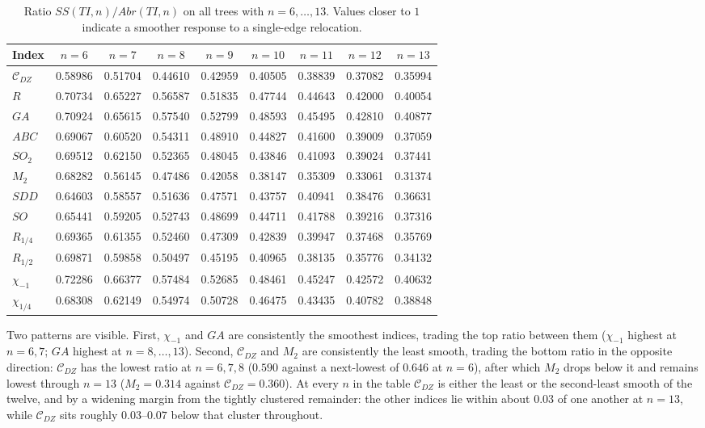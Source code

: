 \documentclass[11pt,a4paper]{article}
\theoremstyle{plain}
\theoremstyle{definition}
\theoremstyle{remark}
\newcommand{\CDZ}{\mathcal{C}_{DZ}}
\begin{document}
\begin{table}[htbp]
\centering
\small
\setlength{\tabcolsep}{4pt}
\caption{Ratio $SS(TI,n)/Abr(TI,n)$ on all trees with $n=6,\dots,13$. Values
closer to $1$ indicate a smoother response to a single-edge relocation.}
\label{tab:ssabr}
\begin{tabular}{lcccccccc}
\toprule
Index & $n{=}6$ & $n{=}7$ & $n{=}8$ & $n{=}9$ & $n{=}10$ & $n{=}11$ & $n{=}12$ & $n{=}13$ \\
\midrule
$\CDZ$       & 0.58986 & 0.51704 & 0.44610 & 0.42959 & 0.40505 & 0.38839 & 0.37082 & 0.35994 \\
$R$          & 0.70734 & 0.65227 & 0.56587 & 0.51835 & 0.47744 & 0.44643 & 0.42000 & 0.40054 \\
$GA$         & 0.70924 & 0.65615 & 0.57540 & 0.52799 & 0.48593 & 0.45495 & 0.42810 & 0.40877 \\
$ABC$        & 0.69067 & 0.60520 & 0.54311 & 0.48910 & 0.44827 & 0.41600 & 0.39009 & 0.37059 \\
$SO_2$       & 0.69512 & 0.62150 & 0.52365 & 0.48045 & 0.43846 & 0.41093 & 0.39024 & 0.37441 \\
$M_2$        & 0.68282 & 0.56145 & 0.47486 & 0.42058 & 0.38147 & 0.35309 & 0.33061 & 0.31374 \\
$SDD$        & 0.64603 & 0.58557 & 0.51636 & 0.47571 & 0.43757 & 0.40941 & 0.38476 & 0.36631 \\
$SO$         & 0.65441 & 0.59205 & 0.52743 & 0.48699 & 0.44711 & 0.41788 & 0.39216 & 0.37316 \\
$R_{1/4}$    & 0.69365 & 0.61355 & 0.52460 & 0.47309 & 0.42839 & 0.39947 & 0.37468 & 0.35769 \\
$R_{1/2}$    & 0.69871 & 0.59858 & 0.50497 & 0.45195 & 0.40965 & 0.38135 & 0.35776 & 0.34132 \\
$\chi_{-1}$  & 0.72286 & 0.66377 & 0.57484 & 0.52685 & 0.48461 & 0.45247 & 0.42572 & 0.40632 \\
$\chi_{1/4}$ & 0.68308 & 0.62149 & 0.54974 & 0.50728 & 0.46475 & 0.43435 & 0.40782 & 0.38848 \\
\bottomrule
\end{tabular}
\end{table}

Two patterns are visible. First, $\chi_{-1}$ and $GA$ are consistently the
smoothest indices, trading the top ratio between them ($\chi_{-1}$ highest at
$n=6,7$; $GA$ highest at $n=8,\dots,13$). Second, $\CDZ$ and $M_2$ are
consistently the least smooth, trading the bottom ratio in the opposite
direction: $\CDZ$ has the lowest ratio at $n=6,7,8$ ($0.590$ against a
next-lowest of $0.646$ at $n=6$), after which $M_2$ drops below it and remains
lowest through $n=13$ ($M_2=0.314$ against $\CDZ=0.360$). At every $n$ in the
table $\CDZ$ is either the least or the second-least smooth of the twelve, and by
a widening margin from the tightly clustered remainder: the other indices lie
within about $0.03$ of one another at $n=13$, while $\CDZ$ sits roughly
$0.03$--$0.07$ below that cluster throughout.
\end{document}
